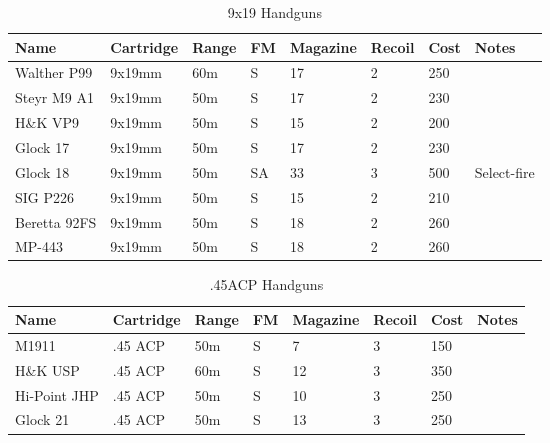 \begin{table}
  \caption{9x19 Handguns}
  \begin{center}
    \begin{tabular}{| l | l | l | l | l | l | l | l |}
      \hline
      \textbf{Name} & \textbf{Cartridge} & \textbf{Range} &
      \textbf{FM} & \textbf{Magazine} & \textbf{Recoil} &
      \textbf{Cost} & \textbf{Notes} \\ \hline

      Walther P99  & 9x19mm & 60m & S  & 17 & 2 & 250 & \\ \hline
      Steyr M9 A1  & 9x19mm & 50m & S  & 17 & 2 & 230 & \\ \hline
      H\&K VP9      & 9x19mm & 50m & S  & 15 & 2 & 200 & \\ \hline
      Glock 17     & 9x19mm & 50m & S  & 17 & 2 & 230 & \\ \hline
      Glock 18     & 9x19mm & 50m & SA & 33 & 3 & 500 & Select-fire \\ \hline
      SIG P226     & 9x19mm & 50m & S  & 15 & 2 & 210 & \\ \hline
      Beretta 92FS & 9x19mm & 50m & S  & 18 & 2 & 260 & \\ \hline
      MP-443       & 9x19mm & 50m & S  & 18 & 2 & 260 & \\ \hline

    \end{tabular}
  \end{center}
\end{table}

\begin{table}
  \caption{.45ACP Handguns}
  \begin{center}
    \begin{tabular}{| l | l | l | l | l | l | l | l |}
      \hline
      \textbf{Name} & \textbf{Cartridge} & \textbf{Range} &
      \textbf{FM} & \textbf{Magazine} & \textbf{Recoil} &
      \textbf{Cost} & \textbf{Notes} \\ \hline

      M1911        & .45 ACP & 50m & S &  7 & 3  & 150 & \\ \hline
      H\&K USP      & .45 ACP & 60m & S & 12 & 3  & 350 & \\ \hline
      Hi-Point JHP & .45 ACP & 50m & S & 10 & 3  & 250 & \\ \hline
      Glock 21     & .45 ACP & 50m & S & 13 & 3  & 250 & \\ \hline

    \end{tabular}
  \end{center}
\end{table}

